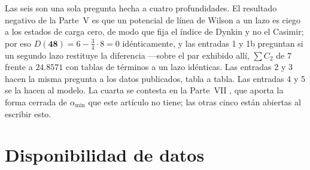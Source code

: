\documentclass[11pt,a4paper]{article}
\newcommand{\rep}[1]{\mathbf{#1}}
\newcommand{\amin}{\alpha_{\min}}
\begin{document}
\medskip
\noindent
Las seis son una sola pregunta hecha a cuatro profundidades. El resultado negativo de la Parte~V es
que un potencial de línea de Wilson a un lazo es ciego a los estados de carga cero, de modo que fija
el índice de Dynkin y no el Casimir; por eso $D(\rep{48})=6-\tfrac34\cdot8=0$ idénticamente, y las
entradas 1 y 1b preguntan si un segundo lazo restituye la diferencia ---sobre el par exhibido allí,
$\sum C_2$ de $7$ frente a $24.8571$ con tablas de términos a un lazo idénticas. Las entradas 2 y 3
hacen la misma pregunta a los datos publicados, tabla a tabla. Las entradas 4 y 5 se la hacen al
modelo. La cuarta se contesta en la Parte~VII \cite{PartVII}, que aporta la forma cerrada de
$\amin$ que este artículo no tiene; las otras cinco están abiertas al escribir esto.

\section*{Disponibilidad de datos}
\end{document}
